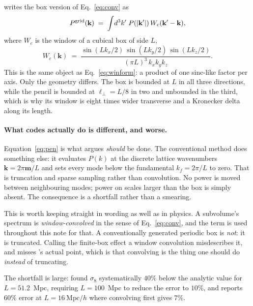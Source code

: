 \documentclass[12pt]{article}
\newcommand{\bk}{\mathbf{k}}
\newcommand{\Mpch}{\ \mathrm{Mpc}/h}
\begin{document}
\citet{Pen1997} writes the box version of Eq.~\eqref{eq:conv} as
\begin{equation}
  \label{eq:pen}
  P^{\rm grid}(\bk) \;=\; \int \! d^3k' \; P(|\bk'|)\, W_c(\bk' - \bk) ,
\end{equation}
where $W_c$ is the window of a cubical box of side $L$,
\begin{equation}
  \label{eq:wc}
  W_c(\bk) \;=\;
  \frac{\sin(L k_x/2)\, \sin(L k_y/2)\, \sin(L k_z/2)}
       {(\pi L)^3\, k_x k_y k_z} .
\end{equation}
This is the same object as Eq.~\eqref{eq:winform}: a product of one sinc-like
factor per axis. Only the geometry differs. The box is bounded at $L$ in all
three directions, while the pencil is bounded at $\ell_\perp = L/8$ in two and
unbounded in the third, which is why its window is eight times wider transverse
and a Kronecker delta along its length.

\paragraph{What codes actually do is different, and worse.}
Equation~\eqref{eq:pen} is what \citet{Pen1997} argues \emph{should} be done. The
conventional method does something else: it evaluates $P(k)$ at the discrete
lattice wavenumbers $\bk = 2\pi\mathbf{m}/L$ and sets every mode below the
fundamental $k_f = 2\pi/L$ to zero. That is truncation and sparse sampling
rather than convolution. No power is moved between neighbouring modes; power on
scales larger than the box is simply absent. The consequence is a shortfall
rather than a smearing.

This is worth keeping straight in wording as well as in physics. A subvolume's
spectrum is \emph{window-convolved} in the sense of Eq.~\eqref{eq:conv}, and the
term is used throughout this note for that. A conventionally generated periodic
box is \emph{not}: it is truncated. Calling the finite-box effect a window
convolution misdescribes it, and misses \citet{Pen1997}'s actual point, which is
that convolving is the thing one should do \emph{instead} of truncating.

The shortfall is large: \citet{Gelb1994} found $\sigma_8$
systematically $40\%$ below the analytic value for $L = 51.2$~Mpc, requiring
$L = 100$~Mpc to reduce the error to $10\%$, and \citet{Pen1997} reports $60\%$
error at $L = 16\Mpch$ where convolving first gives $7\%$.
\end{document}
